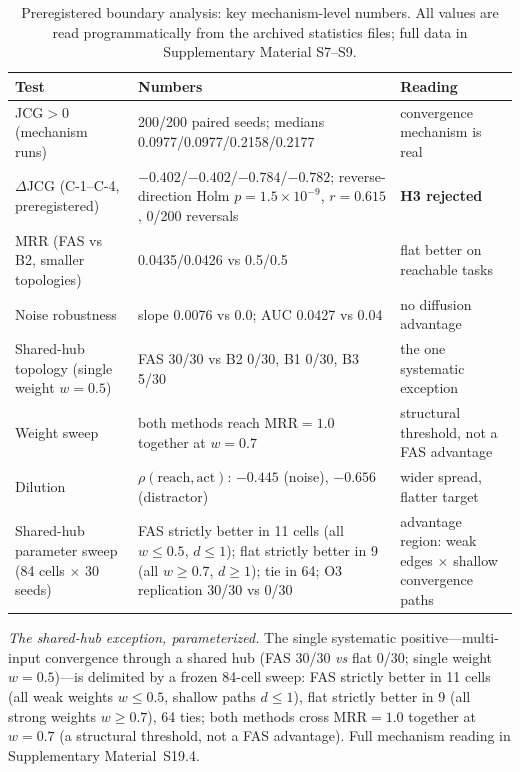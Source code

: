 \documentclass[10pt]{article}
\begin{document}
\begin{table}[t]
\centering\small
\caption{Preregistered boundary analysis: key mechanism-level numbers. All values are read programmatically from the archived statistics files; full data in Supplementary Material S7--S9.}
\label{tab:boundary}
\begin{tabular}{L{4.2cm}L{6.3cm}L{3.3cm}}
\toprule
\textbf{Test} & \textbf{Numbers} & \textbf{Reading} \\
\midrule
JCG${>}0$ (mechanism runs) & 200/200 paired seeds; medians 0.0977/0.0977/0.2158/0.2177 & convergence mechanism is real \\
$\Delta$JCG (C-1--C-4, preregistered) & ${-}0.402$/${-}0.402$/${-}0.784$/${-}0.782$; reverse-direction Holm $p{=}1.5\times10^{-9}$, $r{=}0.615$, 0/200 reversals & \textbf{H3 rejected} \\
MRR (FAS vs B2, smaller topologies) & 0.0435/0.0426 vs 0.5/0.5 & flat better on reachable tasks \\
Noise robustness & slope 0.0076 vs 0.0; AUC 0.0427 vs 0.04 & no diffusion advantage \\
Shared-hub topology (single weight $w{=}0.5$) & FAS 30/30 vs B2 0/30, B1 0/30, B3 5/30 & the one systematic exception \\
Weight sweep & both methods reach MRR${=}1.0$ together at $w{=}0.7$ & structural threshold, not a FAS advantage \\
Dilution & $\rho(\mathrm{reach},\mathrm{act})$: $-0.445$ (noise), $-0.656$ (distractor) & wider spread, flatter target \\
Shared-hub parameter sweep (84 cells $\times$ 30 seeds) & FAS strictly better in 11 cells (all $w{\le}0.5$, $d{\le}1$); flat strictly better in 9 (all $w{\ge}0.7$, $d{\ge}1$); tie in 64; O3 replication 30/30 vs 0/30 & advantage region: weak edges $\times$ shallow convergence paths \\
\bottomrule
\end{tabular}
\end{table}

\emph{The shared-hub exception, parameterized.} The single systematic positive---multi-input convergence through a shared hub (FAS 30/30 \emph{vs} flat 0/30; single weight $w{=}0.5$)---is delimited by a frozen 84-cell sweep: FAS strictly better in 11 cells (all weak weights $w{\le}0.5$, shallow paths $d{\le}1$), flat strictly better in 9 (all strong weights $w{\ge}0.7$), 64 ties; both methods cross MRR${=}1.0$ together at $w{=}0.7$ (a structural threshold, not a FAS advantage). Full mechanism reading in Supplementary Material~S19.4.
\end{document}
